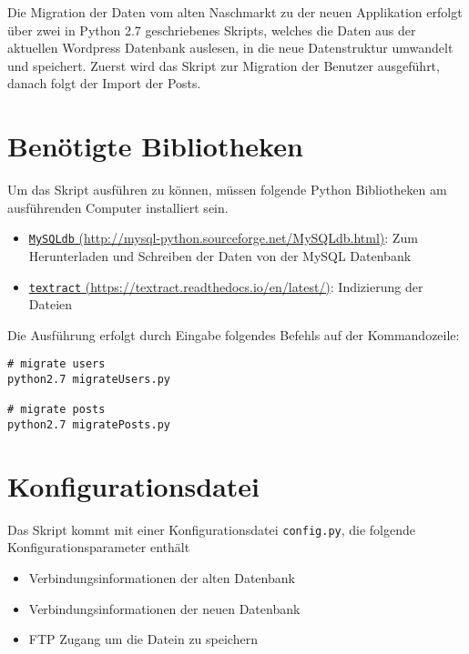 Die Migration der Daten vom alten Naschmarkt zu der neuen Applikation erfolgt \"uber zwei in Python 2.7 geschriebenes Skripts, welches die Daten aus der aktuellen Wordpress Datenbank auslesen, in die neue Datenstruktur umwandelt und speichert.
Zuerst wird das Skript zur Migration der Benutzer ausgef\"uhrt, danach folgt der Import der Posts.

\section{Ben\"otigte Bibliotheken}
Um das Skript ausf\"uhren zu k\"onnen, m\"ussen folgende Python Bibliotheken am ausf\"uhrenden Computer installiert sein.

\begin{itemize}
  \item \href{http://mysql-python.sourceforge.net/MySQLdb.html}{\texttt{MySQLdb} (http://mysql-python.sourceforge.net/MySQLdb.html)}: Zum Herunterladen und Schreiben der Daten von der MySQL Datenbank
  \item \href{https://textract.readthedocs.io/en/latest/}{ \texttt{textract} (https://textract.readthedocs.io/en/latest/)}: Indizierung der Dateien
\end{itemize}

Die Ausf\"uhrung erfolgt durch Eingabe folgendes Befehls auf der Kommandozeile:
\begin{lstlisting}[caption=Migration vom alten Naschmarkt]
# migrate users
python2.7 migrateUsers.py

# migrate posts
python2.7 migratePosts.py
\end{lstlisting}

\section{Konfigurationsdatei}
Das Skript kommt mit einer Konfigurationsdatei \texttt{config.py}, die folgende Konfigurationsparameter enth\"alt

\begin{itemize}
  \item Verbindungsinformationen der alten Datenbank
  \item Verbindungsinformationen der neuen Datenbank
  \item  FTP Zugang um die Datein zu speichern
\end{itemize}

